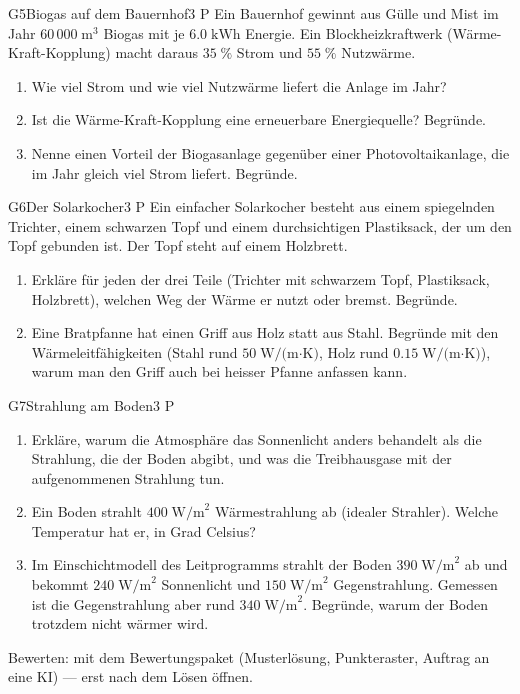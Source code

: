 \documentclass[11pt]{article}
\begin{document}
\begin{lpaufgabe}{G5}{Biogas auf dem Bauernhof}{3 P}
Ein Bauernhof gewinnt aus Gülle und Mist im Jahr \(60\,000\;\text{m}^3\) Biogas mit je \(6.0\;\text{kWh}\) Energie. Ein Blockheizkraftwerk (Wärme-Kraft-Kopplung) macht daraus \(35\;\%\) Strom und \(55\;\%\) Nutzwärme.
\begin{enumerate}[label=\alph*),leftmargin=*,itemsep=2pt,topsep=2pt]
\item Wie viel Strom und wie viel Nutzwärme liefert die Anlage im Jahr?
\item Ist die Wärme-Kraft-Kopplung eine erneuerbare Energiequelle? Begründe.
\item Nenne einen Vorteil der Biogasanlage gegenüber einer Photovoltaikanlage, die im Jahr gleich viel Strom liefert. Begründe.
\end{enumerate}
\end{lpaufgabe}


\begin{lpaufgabe}{G6}{Der Solarkocher}{3 P}
Ein einfacher Solarkocher besteht aus einem spiegelnden Trichter, einem schwarzen Topf und einem durchsichtigen Plastiksack, der um den Topf gebunden ist. Der Topf steht auf einem Holzbrett.
\begin{enumerate}[label=\alph*),leftmargin=*,itemsep=2pt,topsep=2pt]
\item Erkläre für jeden der drei Teile (Trichter mit schwarzem Topf, Plastiksack, Holzbrett), welchen Weg der Wärme er nutzt oder bremst. Begründe.
\item Eine Bratpfanne hat einen Griff aus Holz statt aus Stahl. Begründe mit den Wärmeleitfähigkeiten (Stahl rund \(50\;\text{W/(m·K)}\), Holz rund \(0.15\;\text{W/(m·K)}\)), warum man den Griff auch bei heisser Pfanne anfassen kann.
\end{enumerate}
\end{lpaufgabe}

\begin{lpaufgabe}{G7}{Strahlung am Boden}{3 P}
\begin{enumerate}[label=\alph*),leftmargin=*,itemsep=2pt,topsep=2pt]
\item Erkläre, warum die Atmosphäre das Sonnenlicht anders behandelt als die Strahlung, die der Boden abgibt, und was die Treibhausgase mit der aufgenommenen Strahlung tun.
\item Ein Boden strahlt \(400\;\text{W/m}^2\) Wärmestrahlung ab (idealer Strahler). Welche Temperatur hat er, in Grad Celsius?
\item Im Einschichtmodell des Leitprogramms strahlt der Boden \(390\;\text{W/m}^2\) ab und bekommt \(240\;\text{W/m}^2\) Sonnenlicht und \(150\;\text{W/m}^2\) Gegenstrahlung. Gemessen ist die Gegenstrahlung aber rund \(340\;\text{W/m}^2\). Begründe, warum der Boden trotzdem nicht wärmer wird.
\end{enumerate}
\end{lpaufgabe}

\vfill
{\small\color{lpgrau}Bewerten: mit dem Bewertungspaket (Musterlösung, Punkteraster, Auftrag an eine KI) — erst nach dem Lösen öffnen.}
\end{document}
